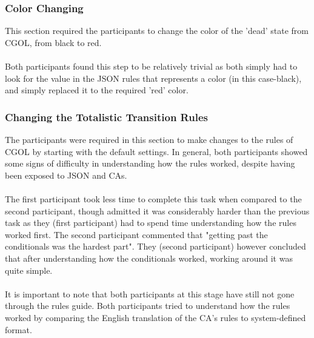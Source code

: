 \subsubsection{Color Changing}
This section required the participants to change the color of the 'dead' state from CGOL, from black to red. 
\\ \\
Both participants found this step to be relatively trivial as both simply had to look for the value in the JSON rules that represents a color (in this case-black), and simply replaced it to the required 'red' color. 

\subsubsection{Changing the Totalistic Transition Rules}
The participants were required in this section to make changes to the rules of CGOL by starting with the default settings. In general, both participants showed some signs of difficulty in understanding how the rules worked, despite having been exposed to JSON and CAs.  
\\ \\
The first participant took less time to complete this task when compared to the second participant, though admitted it was considerably harder than the previous task as they (first participant) had to spend time understanding how the rules worked first. The second participant commented that "getting past the conditionals was the hardest part". They (second participant) however concluded that after understanding how the conditionals worked, working around it was quite simple. 
\\ \\
It is important to note that both participants at this stage have still not gone through the rules guide. Both participants tried to understand how the rules worked by comparing the English translation of the CA's rules to system-defined format. 

